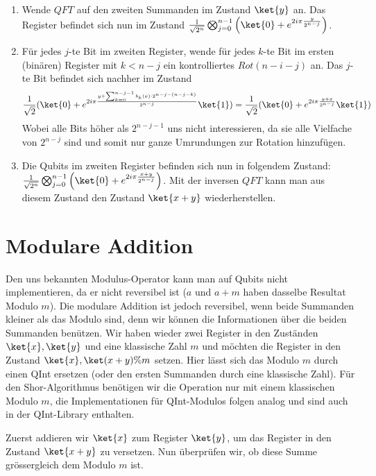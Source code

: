 \begin{enumerate}
    \item Wende $QFT$ auf den zweiten Summanden im Zustand $\ket{y}$ an. Das Register befindet sich nun im Zustand $\frac{1}{\sqrt{2^n}}\bigotimes_{j = 0}^{n - 1}\left(\ket{0} + e^{2i\pi\frac{y}{2^{n - j}}}\right)$.
    \item Für jedes $j$-te Bit im zweiten Register, wende für jedes $k$-te Bit im ersten (binären) Register mit $k < n - j$ ein kontrolliertes $Rot(n - i - j)$ an. Das $j$-te Bit befindet sich nachher im Zustand 
    \begin{align*}
        \frac{1}{\sqrt{2}}(\ket{0} + e^{2i\pi\frac{y + \sum_{k = 0}^{n - j - 1}{b_k(x)\cdot 2^{n - j - (n - j - k)}}}{2^{n - j}}}\ket{1})
        = \frac{1}{\sqrt{2}}(\ket{0} + e^{2i\pi\frac{y + x}{2^{n - j}}}\ket{1})
    \end{align*}
    Wobei alle Bits höher als $2^{n - j - 1}$ uns nicht interessieren, da sie alle Vielfache von $2^{n - j}$ sind und somit nur ganze Umrundungen zur Rotation hinzufügen.
    \item Die Qubits im zweiten Register befinden sich nun in folgendem Zustand: $\frac{1}{\sqrt{2^n}}\bigotimes_{j = 0}^{n - 1}\left(\ket{0} + e^{2i\pi\frac{x + y}{2^{n - j}}}\right)$. Mit der inversen $QFT$ kann man aus diesem Zustand den Zustand $\ket{x + y}$ wiederherstellen.
\end{enumerate}
\section{Modulare Addition}
Den uns bekannten Modulus-Operator kann man auf Qubits nicht implementieren, da er nicht reversibel ist ($a$ und $a + m$ haben dasselbe Resultat Modulo $m$). Die modulare Addition ist jedoch reversibel, wenn beide Summanden kleiner als das Modulo sind, denn wir können die Informationen über die beiden Summanden benützen. Wir haben wieder zwei Register in den Zuständen $\ket{x}, \ket{y}$ und eine klassische Zahl $m$ und möchten die Register in den Zustand $\ket{x}, \ket{(x + y) \% m}$ setzen. Hier lässt sich das Modulo $m$ durch einen QInt ersetzen (oder den ersten Summanden durch eine klassische Zahl). Für den Shor-Algorithmus benötigen wir die Operation nur mit einem klassischen Modulo $m$, die Implementationen für QInt-Modulos folgen analog und sind auch in der QInt-Library enthalten.

Zuerst addieren wir $\ket{x}$ zum Register $\ket{y}$, um das Register in den Zustand $\ket{x + y}$ zu versetzen. Nun überprüfen wir, ob diese Summe grössergleich dem Modulo $m$ ist. 

